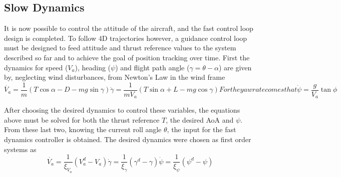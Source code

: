 \subsection{Slow Dynamics}

It is now possible to control the attitude of the aircraft, and the fast control loop design is completed. To follow 4D trajectories however, a guidance control loop must be designed to feed attitude and thrust reference values to the system described so far and to achieve the goal of position tracking over time. First the dynamics for speed ($V_a$), heading ($\psi$) and flight path angle ($\gamma = \theta - \alpha$) are given by, neglecting wind disturbances, from Newton's Law in the wind frame
\begin{subequations}
\begin{equation}
\dot{V_a} = \dfrac{1}{m}(T\cos \alpha -D - mg\sin \gamma)
\label{eq:va_dot}
\end{equation}
\begin{equation}
\dot{\gamma} = \dfrac{1}{mV_a}(T\sin \alpha +L - mg\cos \gamma)
\label{eq:gamma_dot}
\end{equation}
For the yaw rate comes that 

\begin{equation}
\dot{\psi} = \dfrac{g}{V_a} \tan \phi
\label{eq:psi_dot}
\end{equation}
\end{subequations}


After choosing the desired dynamics to control these variables, the equations above must be solved for both the thrust reference $T$, the desired AoA and $\psi$. From these last two, knowing the current roll angle $\theta$, the input for the fast dynamics controller is obtained. The desired dynamics were chosen as first order systems as
\begin{subequations}
\begin{equation}
\dot{V_a} = \dfrac{1}{\xi_{V_a}}(V_a^d-V_a)
\label{eq:va_dot_des}
\end{equation}
\begin{equation}
\dot{\gamma} = \dfrac{1}{\xi_{\gamma}}(\gamma^d-\gamma)
\label{eq:gamma_dot_des}
\end{equation}
\begin{equation}
\dot{\psi} = \dfrac{1}{\xi_{\psi}}(\psi^d-\psi)
\label{eq:psi_dot_des}
\end{equation}
\end{subequations}

